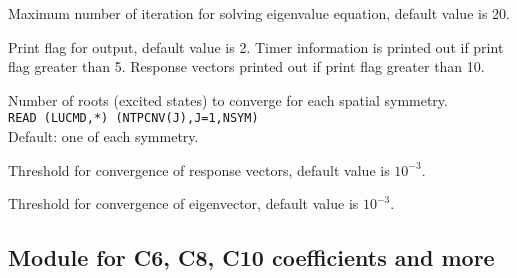 \begin{description}
\item{}
Maximum number of iteration for solving eigenvalue equation, default
value is 20.

\item{}
Print flag for output, default value is 2. Timer information is printed
out if print flag greater than 5. Response vectors printed out if
print flag greater than 10.

\item{}
Number of roots (excited states) to converge for each spatial symmetry. \\
\verb|READ (LUCMD,*) (NTPCNV(J),J=1,NSYM)|\\
Default: one of each symmetry.

\item{}
Threshold for convergence of response vectors, default value is $10^{-3}$.

\item{}
Threshold for convergence of eigenvector, default value is $10^{-3}$.

\end{description}

\subsection{Module for C6, C8, C10 coefficients and more}


